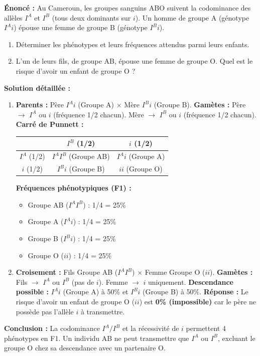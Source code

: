 \documentclass[11pt]{article}
\begin{document}
\begin{exoresolu}
    \textbf{Énoncé :} Au Cameroun, les groupes sanguins ABO suivent la codominance des allèles $I^A$ et $I^B$ (tous deux dominants sur $i$). Un homme de groupe A (génotype $I^A i$) épouse une femme de groupe B (génotype $I^B i$).
    \begin{enumerate}
        \item Déterminer les phénotypes et leurs fréquences attendus parmi leurs enfants.
        \item L'un de leurs fils, de groupe AB, épouse une femme de groupe O. Quel est le risque d'avoir un enfant de groupe O ?
    \end{enumerate}
    \tcblower
    \textbf{Solution détaillée :}
    \begin{enumerate}
        \item \textbf{Parents :} Père $I^A i$ (Groupe A) $\times$ Mère $I^B i$ (Groupe B).
        \textbf{Gamètes :} Père $\to$ $I^A$ ou $i$ (fréquence 1/2 chacun). Mère $\to$ $I^B$ ou $i$ (fréquence 1/2 chacun).
        \textbf{Carré de Punnett :}
        \begin{center}
        \begin{tabular}{|c|c|c|}\hline
        & $I^B$ (1/2) & $i$ (1/2) \\ \hline
        $I^A$ (1/2) & $I^A I^B$ (Groupe AB) & $I^A i$ (Groupe A) \\ \hline
        $i$ (1/2) & $I^B i$ (Groupe B) & $ii$ (Groupe O) \\ \hline
        \end{tabular}
        \end{center}
        \textbf{Fréquences phénotypiques (F1) :}
        \begin{itemize}
            \item Groupe AB ($I^A I^B$) : 1/4 = 25\%
            \item Groupe A ($I^A i$) : 1/4 = 25\%
            \item Groupe B ($I^B i$) : 1/4 = 25\%
            \item Groupe O ($ii$) : 1/4 = 25\%
        \end{itemize}
        \item \textbf{Croisement :} Fils Groupe AB ($I^A I^B$) $\times$ Femme Groupe O ($ii$).
        \textbf{Gamètes :} Fils $\to$ $I^A$ ou $I^B$ (pas de $i$). Femme $\to$ $i$ uniquement.
        \textbf{Descendance possible :} $I^A i$ (Groupe A) à 50\% et $I^B i$ (Groupe B) à 50\%.
        \textbf{Réponse :} Le risque d'avoir un enfant de groupe O ($ii$) est \textbf{0\% (impossible)} car le père ne possède pas l'allèle $i$ à transmettre.
    \end{enumerate}
    \textbf{Conclusion :} La codominance $I^A/I^B$ et la récessivité de $i$ permettent 4 phénotypes en F1. Un individu AB ne peut transmettre que $I^A$ ou $I^B$, excluant le groupe O chez sa descendance avec un partenaire O.
\end{exoresolu}
\end{document}
